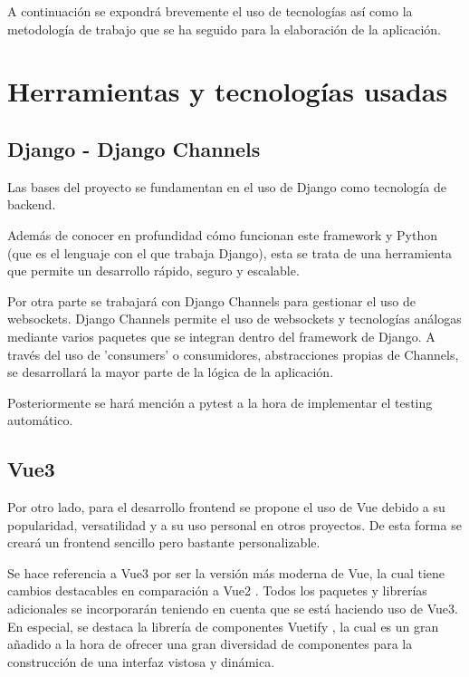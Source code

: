 A continuación se expondrá brevemente el uso de tecnologías así como la metodología
de trabajo que se ha seguido para la elaboración de la aplicación.

\section{Herramientas y tecnologías usadas}

\subsection{Django - Django Channels}

Las bases del proyecto se fundamentan en el uso de Django \cite{django} como tecnología de backend.

Además de conocer en profundidad cómo funcionan este framework y Python (que es el lenguaje con el que trabaja Django),
esta se trata de una herramienta que permite un desarrollo rápido, seguro y escalable.

Por otra parte se trabajará con Django Channels \cite{djangoChannels} para gestionar el uso de websockets. Django Channels
permite el uso de websockets y tecnologías análogas mediante varios paquetes  que se integran dentro del framework de Django.
A través del uso de 'consumers' o consumidores, abstracciones propias de Channels, 
se desarrollará la mayor parte de la lógica de la aplicación. 

Posteriormente se hará mención a pytest \cite{pytest} a la hora de implementar el testing automático.

\subsection{Vue3}

Por otro lado, para el desarrollo frontend se propone el uso de Vue \cite{vue3} debido a su popularidad, versatilidad
y a su uso personal en otros proyectos. De esta forma se creará un frontend sencillo pero bastante personalizable.

Se hace referencia a Vue3 por ser la versión más moderna de Vue, la cual tiene cambios destacables en comparación
a Vue2 \cite{vue3vue2}. Todos los paquetes y librerías adicionales se incorporarán teniendo en cuenta que se está haciendo uso de
Vue3. En especial, se destaca la librería de componentes Vuetify \cite{vuetify}, la cual es un gran añadido a la hora de
ofrecer una gran diversidad de componentes para la construcción de una interfaz vistosa y dinámica.

